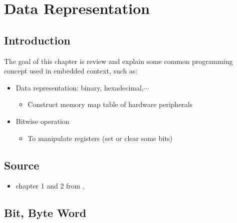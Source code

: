 

\chapter{Data Representation}

\section{Introduction}

The goal of this chapter is review and explain some common programming concept used in embedded context, such as:

	\begin{itemize}

	\item Data representation: binary, hexadecimal,$\cdots$
	
	\begin{itemize}
	\item Construct memory map table of hardware peripherals
	\end{itemize}

	\item Bitwise operation
	
		\begin{itemize}
		\item To manipulate registers (set or clear some bits)
		\end{itemize}			
	
	\end{itemize}

\section{Source}

\begin{itemize}

\item chapter 1 and 2 from \cite{book_Embedded_systems_ARM_Cortex_M_YifengZhu},  

\end{itemize}

\newpage
\section{Bit, Byte Word}

